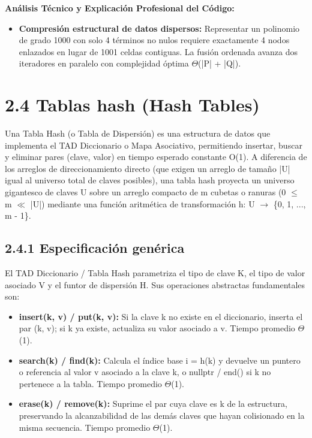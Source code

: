 \documentclass[11pt,letterpaper]{article}
\begin{document}
\noindent\textbf{\color{ipnguinda}Análisis Técnico y Explicación Profesional del Código:}\par\vspace{-2pt}
\begin{itemize}
\setlength{\itemsep}{2pt}\setlength{\parskip}{0pt}
  \item \textbf{Compresión estructural de datos dispersos: }Representar un polinomio de grado 1000 con solo 4 términos no nulos requiere exactamente 4 nodos enlazados en lugar de 1001 celdas contiguas. La fusión ordenada avanza dos iteradores en paralelo con complejidad óptima $\Theta$(|P| + |Q|).
\end{itemize}
\section*{2.4 Tablas hash (Hash Tables)}
Una Tabla Hash (o Tabla de Dispersión) es una estructura de datos que implementa el TAD Diccionario o Mapa Asociativo, permitiendo insertar, buscar y eliminar pares (clave, valor) en tiempo esperado constante O(1). A diferencia de los arreglos de direccionamiento directo (que exigen un arreglo de tamaño |U| igual al universo total de claves posibles), una tabla hash proyecta un universo gigantesco de claves U sobre un arreglo compacto de m cubetas o ranuras (0 $\le$ m $\ll$ |U|) mediante una función aritmética de transformación h: U $\rightarrow$ \{0, 1, ..., m - 1\}.\par
\subsection*{2.4.1 Especificación genérica}
El TAD Diccionario / Tabla Hash parametriza el tipo de clave K, el tipo de valor asociado V y el funtor de dispersión H. Sus operaciones abstractas fundamentales son:\par
\begin{itemize}
\setlength{\itemsep}{2pt}\setlength{\parskip}{0pt}
  \item \textbf{insert(k, v) / put(k, v): }Si la clave k no existe en el diccionario, inserta el par (k, v); si k ya existe, actualiza su valor asociado a v. Tiempo promedio $\Theta$(1).
  \item \textbf{search(k) / find(k): }Calcula el índice base i = h(k) y devuelve un puntero o referencia al valor v asociado a la clave k, o nullptr / end() si k no pertenece a la tabla. Tiempo promedio $\Theta$(1).
  \item \textbf{erase(k) / remove(k): }Suprime el par cuya clave es k de la estructura, preservando la alcanzabilidad de las demás claves que hayan colisionado en la misma secuencia. Tiempo promedio $\Theta$(1).
\end{itemize}
\end{document}
